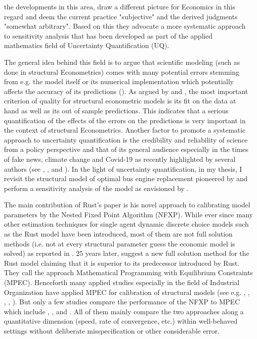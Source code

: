 the developments in this area, \cite{Harenberg.2019} draw a different picture for Economics in this regard and deem the current practice "subjective" and the derived judgments "somewhat arbitrary". Based on this they advocate a more systematic approach to sensitivity analysis that has been developed as part of the applied mathematics field of Uncertainty Quantification (UQ).

The general idea behind this field is to argue that scientific modeling (such as done in structural Econometrics) comes with many potential errors stemming from e.g. the model itself or its numerical implementation which potentially affects the accuracy of its predictions (\cite{Smith.2013}). As argued by \cite{Keane.2010} and \cite{Rust.2010}, the most important criterion of quality for structural econometric models is its fit on the data at hand as well as its out of sample predictions. This indicates that a serious quantification of the effects of the errors on the predictions is very important in the context of structural Econometrics. Another factor to promote a systematic approach to uncertainty quantification is the credibility and reliability of science from a policy perspective and that of its general audience especially in the times of fake news, climate change and Covid-19 as recently highlighted by several authors (see \cite{Fischhoff.2014} \cite{DeBruin.2019}, \cite{VanDerBles.2019}, \cite{Manski.2019} and \cite{Manski.2020}). In the light of uncertainty quantification, in my thesis, I revisit the structural model of optimal bus engine replacement pioneered by \cite{Rust.1987} and perform a sensitivity analysis of the model as envisioned by \cite{Leamer.1983}.

The main contribution of Rust's paper is his novel approach to calibrating model parameters by the Nested Fixed Point Algorithm (NFXP). While ever since many other estimation techniques for single agent dynamic discrete choice models such as the Rust model have been introduced, most of them are not full solution methods (i.e. not at every structural parameter guess the economic model is solved) as reported in \cite{Aguirregabiri.2010}. 25 years later, \cite{Su.Judd.2012} suggest a new full solution method for the Rust model claiming that it is superior to its predecessor introduced by Rust. They call the approach Mathematical Programming with Equilibrium Constraints (MPEC). Henceforth many applied studies especially in the field of Industrial Organization have applied MPEC for calibration of structural models (see e.g. \cite{Aryal.2013}, \cite{Kaiser.2014}, \cite{Hubbard.2009}, \cite{Reynaert.2014}, \cite{Freyberger.2015}). But only a few studies compare the performance of the NFXP to MPEC which include \cite{Su.Judd.2012}, \cite{Dube.Fox.Su.2012}, \cite{Iskhakov.2016} and \cite{Dong.Hsieh.Zhang.2017}. All of them mainly compare the two approaches along a quantitative dimension (speed, rate of convergence, etc.) within well-behaved settings without deliberate misspecification or other considerable error.

